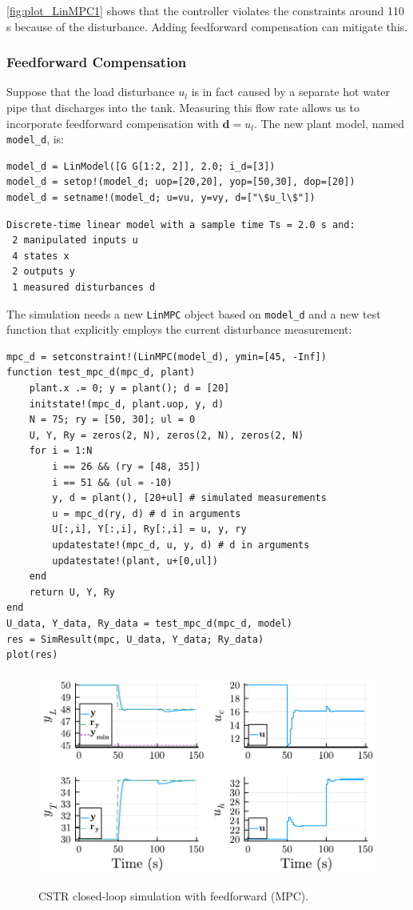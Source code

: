 \cref{fig:plot_LinMPC1} shows that the controller violates the constraints around 110 s because of the disturbance. Adding feedforward compensation can mitigate this.

\subsubsection{Feedforward Compensation}

Suppose that the load disturbance $u_l$ is in fact caused by a separate hot water pipe that discharges into the tank. Measuring this flow rate allows us to incorporate feedforward compensation with $\mathbf{d}=u_l$. The new plant model, named \texttt{model\_d}, is:

\begin{verbatim}
model_d = LinModel([G G[1:2, 2]], 2.0; i_d=[3])
model_d = setop!(model_d; uop=[20,20], yop=[50,30], dop=[20])
model_d = setname!(model_d; u=vu, y=vy, d=["\$u_l\$"])
\end{verbatim}
\spacerepl
\begin{verbatim}
Discrete-time linear model with a sample time Ts = 2.0 s and:
 2 manipulated inputs u
 4 states x
 2 outputs y
 1 measured disturbances d
\end{verbatim}

The simulation needs a new \texttt{LinMPC} object based on \texttt{model\_d} and a new test function that explicitly employs the current disturbance measurement:

\begin{verbatim}
mpc_d = setconstraint!(LinMPC(model_d), ymin=[45, -Inf])
function test_mpc_d(mpc_d, plant)
    plant.x .= 0; y = plant(); d = [20]
    initstate!(mpc_d, plant.uop, y, d)
    N = 75; ry = [50, 30]; ul = 0
    U, Y, Ry = zeros(2, N), zeros(2, N), zeros(2, N)
    for i = 1:N
        i == 26 && (ry = [48, 35])
        i == 51 && (ul = -10)
        y, d = plant(), [20+ul] # simulated measurements
        u = mpc_d(ry, d) # d in arguments
        U[:,i], Y[:,i], Ry[:,i] = u, y, ry
        updatestate!(mpc_d, u, y, d) # d in arguments
        updatestate!(plant, u+[0,ul])
    end
    return U, Y, Ry
end
U_data, Y_data, Ry_data = test_mpc_d(mpc_d, model)
res = SimResult(mpc, U_data, Y_data; Ry_data)
plot(res)
\end{verbatim}

\begin{figure}[b]
    \centering
    \caption{CSTR closed-loop simulation with feedforward (MPC).}
    \includegraphics[width=0.5\columnwidth]{fig/plot_LinMPC2.pdf}
    \label{fig:plot_LinMPC2}
\end{figure}

